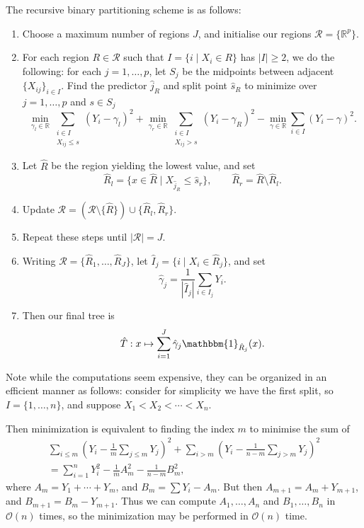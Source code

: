 \documentclass[12pt]{article}
\begin{document}
The recursive binary partitioning scheme is as follows:
\begin{enumerate}
	\item Choose a maximum number of regions $J$, and initialise our regions $\mathcal{R} = \{\mathbb{R}^p\}$.
	\item For each region $R \in \mathcal{R}$ such that $I = \{ i \mid X_i \in R\}$ has $|I| \geq 2$, we do the following: for each $j = 1, \ldots, p$, let $S_j$ be the midpoints between adjacent $\{X_{ij}\}_{i \in I}$. Find the predictor $\hat j_R$ and split point $\hat s_R$ to minimize over $j = 1, \ldots, p$ and  $s \in S_j$ 
		\[
			\min_{\gamma_l \in \mathbb{R}} \sum_{\substack{i \in I \\ X_{ij} \leq s}} (Y_i - \gamma_l)^2 + \min_{\gamma_r \in \mathbb{R}}\sum_{\substack{i \in I \\ X_{ij} > s}} (Y_i - \gamma_R)^2 - \min_{\gamma \in \mathbb{R}} \sum_{i \in I} (Y_i - \gamma)^2.
		\]
	\item Let $\hat R$ be the region yielding the lowest value, and set
		\[
			\hat R_l = \{x \in \hat R \mid X_{\hat j_R} \leq \hat s_r\}, \qquad \hat R_r = \hat R \setminus \hat R_l.
		\]
	\item Update $\mathcal{R} = (\mathcal{R} \setminus \{\hat R\}) \cup \{\hat R_l, \hat R_r\}$.
	\item Repeat these steps until $|\mathcal{R}| = J$.
	\item Writing $\mathcal{R} = \{\hat R_1, \ldots, \hat R_J\}$, let $\hat I_j = \{i \mid X_i \in \hat R_j\}$, and set
		\[
		\hat \gamma_j = \frac{1}{|\hat I_j|} \sum_{i \in I_j} Y_i.
		\]
	\item Then our final tree is
		\[
		\hat T : x \mapsto \sum_{i = 1}^J \hat \gamma_j \mathbbm{1}_{\hat R_j}(x).
		\]
\end{enumerate}

Note while the computations seem expensive, they can be organized in an efficient manner as follows: consider for simplicity we have the first split, so $I = \{1, \ldots, n\}$, and suppose $X_1 < X_2 < \cdots < X_n$.

Then minimization is equivalent to finding the index $m$ to minimise the sum of
\begin{align*}
	\sum_{i \leq m} \left( Y_i - \frac{1}{m} \sum_{j \leq m} Y_j \right)^2 + \sum_{i > m} \left(Y_i - \frac{1}{n - m}\sum_{j > m} Y_j \right)^2 \\
	= \sum_{i = 1}^n Y_i^2 - \frac{1}{m} A_m^2 - \frac{1}{n - m} B_m^2,
\end{align*}
where $A_{m} = Y_1 + \cdots + Y_m$, and $B_m = \sum Y_i - A_m$. But then $A_{m+1} = A_m + Y_{m+1}$, and $B_{m+1} = B_m - Y_{m+1}$. Thus we can compute $A_1, \ldots, A_n$ and $B_1, \ldots, B_n$ in $\mathcal{O}(n)$ times, so the minimization may be performed in $\mathcal{O}(n)$ time.
\end{document}
